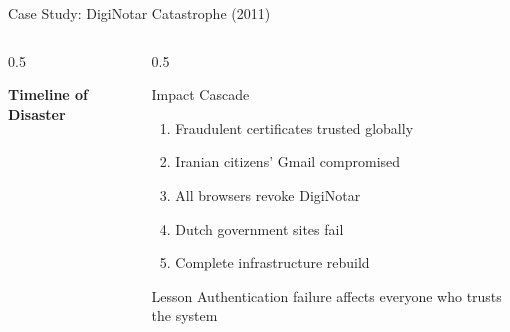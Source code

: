 \documentclass[aspectratio=169,10pt]{beamer}
\theoremstyle{plain}
\begin{document}
\begin{frame}{Case Study: DigiNotar Catastrophe (2011)}
   \begin{columns}
       \begin{column}{0.5\textwidth}
           \begin{center}
               \textbf{\Large Timeline of Disaster}
               
           \end{center}
       \end{column}
       
       \begin{column}{0.5\textwidth}
           \begin{alertblock}{Impact Cascade}
               \pause
               \begin{enumerate}
                   \item Fraudulent certificates trusted globally
                   \pause
                   \item Iranian citizens' Gmail compromised
                   \pause
                   \item All browsers revoke DigiNotar
                   \pause
                   \item Dutch government sites fail
                   \pause
                   \item Complete infrastructure rebuild
               \end{enumerate}
           \end{alertblock}
           
           \pause
           \begin{block}{Lesson}
               Authentication failure affects everyone who trusts the system
           \end{block}
       \end{column}
   \end{columns}
\end{frame}
\end{document}
